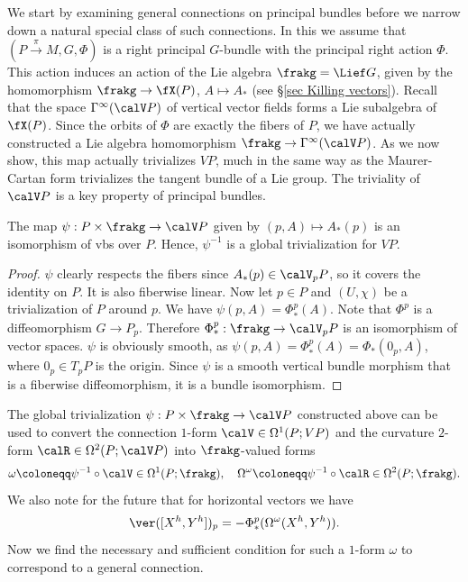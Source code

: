 We start by examining general connections on principal bundles before we narrow down a natural special class of such connections. In this \subsect we assume that $(P\overset{\pi}{\to}M,G,\Phi)$ is a right principal $G$-bundle with the principal right action $\Phi$. This action induces an action of the Lie algebra $\frakg=\Lief G$, given by the homomorphism $\frakg\to \fX(P)$, $A\mapsto A_\ast$ (see \S\ref{sec Killing vectors}). Recall that the space $\Gamma^\infty(\calV P)$ of vertical vector fields forms a Lie subalgebra of $\fX(P)$. Since the orbits of $\Phi$ are exactly the fibers of $P$, we have actually constructed a Lie algebra homomorphism $\frakg\to \Gamma^\infty(\calV P)$. As we now show, this map actually trivializes $VP$, much in the same way as the Maurer-Cartan form trivializes the tangent bundle of a Lie group. The triviality of $\calV P$ is a key property of principal bundles.

\begin{prop}[{{\cite[Lem.~1.3.1]{RS2}}}]\label{lem 1.3.1 RS2}
    The map $\psi:P\times\frakg\to \calV P$ given by $(p,A)\mapsto A_\ast(p)$ is an isomorphism of \glspl{vb} over $P$. Hence, $\psi^{-1}$ is a global trivialization for $VP$.
\end{prop}
\begin{proof}
    $\psi$ clearly respects the fibers since $A_\ast(p)\in \calV_pP$, so it covers the identity on $P$. It is also fiberwise linear. Now let $p\in P$ and $(U,\chi)$ be a trivialization of $P$ around $p$. We have $\psi(p,A)=\Phi^p_{\ast}(A)$. Note that $\Phi^p$ is a diffeomorphism $G\to P_p$. Therefore $\Phi^{p}_\ast:\frakg\to \calV_pP$ is an isomorphism of vector spaces. $\psi$ is obviously smooth, as $\psi(p,A)=\Phi^p_\ast(A)=\Phi_\ast(0_p,A)$, where $0_p\in T_pP$ is the origin. Since $\psi$ is a smooth vertical bundle morphism that is a fiberwise diffeomorphism, it is a bundle isomorphism.
\end{proof}


The global trivialization $\psi:P\times\frakg\to \calV P$ constructed above can be used to convert the connection $1$-form $\calV\in\Omega^1(P;VP)$ and the curvature $2$-form $\calR\in \Omega^2(P;\calV P)$ into $\frakg$-valued forms
 \[\omega\coloneqq \psi^{-1}\circ \calV \in\Omega^1(P;\frakg),\quad \Omega^\omega\coloneqq \psi^{-1}\circ \calR\in \Omega^2(P;\frakg).\]
We also note for the future that for horizontal vectors we have
\[\ver([X^h,Y^h])_p=-\Phi^p_\ast(\Omega^\omega(X^h,Y^h)).\label{eq 1.4.5 RS2}\]
Now we find the necessary and sufficient condition for such a $1$-form $\omega$ to correspond to a general connection.

